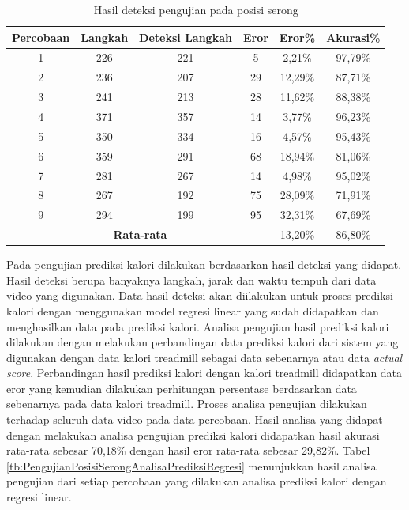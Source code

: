 \begin{longtable}{|c|c|c|c|c|c|}
  \caption{Hasil deteksi pengujian pada posisi serong}
  \label{tb:PengujianPosisiSerongAnalisaDeteksi}                                   \\
  \hline
  \rowcolor[HTML]{C0C0C0}
  \textbf{Percobaan} & \textbf{Langkah} & \textbf{Deteksi Langkah} & \textbf{Eror} & \textbf{Eror\%} & \textbf{Akurasi\%} \\
  \hline
  1   & 226   & 221  & 5   & 2,21\%    & 97,79\%   \\
  \hline
  2   & 236   & 207  & 29  & 12,29\%   & 87,71\%   \\
  \hline
  3   & 241   & 213  & 28  & 11,62\%   & 88,38\%   \\
  \hline
  4   & 371   & 357  & 14  & 3,77\%    & 96,23\%   \\
  \hline
  5   & 350   & 334  & 16  & 4,57\%    & 95,43\%   \\
  \hline
  6   & 359   & 291  & 68  & 18,94\%   & 81,06\%   \\
  \hline
  7   & 281   & 267  & 14  & 4,98\%    & 95,02\%   \\
  \hline
  8   & 267   & 192  & 75  & 28,09\%   & 71,91\%   \\
  \hline
  9   & 294   & 199  & 95  & 32,31\%   & 67,69\%   \\
  \hline

  \multicolumn{4}{|c|}{\textbf{Rata-rata}} & 13,20\% & 86,80\% \\
  \hline
\end{longtable}

Pada pengujian prediksi kalori dilakukan berdasarkan hasil deteksi yang didapat. Hasil deteksi berupa banyaknya langkah, jarak dan waktu tempuh dari data video yang digunakan. Data hasil deteksi akan diilakukan untuk proses prediksi kalori dengan menggunakan model regresi linear yang sudah didapatkan dan menghasilkan data pada prediksi kalori. Analisa pengujian hasil prediksi kalori dilakukan dengan melakukan perbandingan data prediksi kalori dari sistem yang digunakan dengan data kalori treadmill sebagai data sebenarnya atau data \emph{actual score}. Perbandingan hasil prediksi kalori dengan kalori treadmill didapatkan data eror yang kemudian dilakukan perhitungan persentase berdasarkan data sebenarnya pada data kalori treadmill. Proses analisa pengujian dilakukan terhadap seluruh data video pada data percobaan. Hasil analisa yang didapat dengan melakukan analisa pengujian prediksi kalori didapatkan hasil akurasi rata-rata sebesar 70,18\% dengan hasil eror rata-rata sebesar 29,82\%. Tabel \ref{tb:PengujianPosisiSerongAnalisaPrediksiRegresi} menunjukkan hasil analisa pengujian dari setiap percobaan yang dilakukan analisa prediksi kalori dengan regresi linear.

